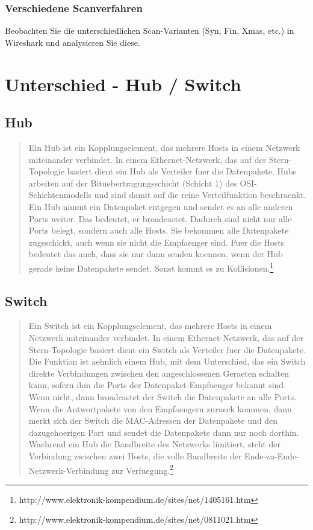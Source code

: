 \documentclass[a4paper]{report}
\begin{document}
\subsection{Verschiedene Scanverfahren}
Beobachten Sie die unterschiedlichen Scan-Varianten (Syn, Fin, Xmas, etc.) in Wireshark und analysieren Sie diese.

\chapter{Unterschied - Hub / Switch}

\section{Hub}
\begin{quote}
Ein Hub ist ein Kopplungselement, das mehrere Hosts in einem Netzwerk miteinander verbindet. In einem Ethernet-Netzwerk, das auf der Stern-Topologie basiert dient ein Hub als Verteiler fuer die Datenpakete. Hubs arbeiten auf der Bituebertragungsschicht (Schicht 1) des OSI-Schichtenmodells und sind damit auf die reine Verteilfunktion beschraenkt.
Ein Hub nimmt ein Datenpaket entgegen und sendet es an alle anderen Ports weiter. Das bedeutet, er broadcastet. Dadurch sind nicht nur alle Ports belegt, sondern auch alle Hosts. Sie bekommen alle Datenpakete zugeschickt, auch wenn sie nicht die Empfaenger sind. Fuer die Hosts bedeutet das auch, dass sie nur dann senden koennen, wenn der Hub gerade keine Datenpakete sendet. Sonst kommt es zu Kollisionen.\footnote{http://www.elektronik-kompendium.de/sites/net/1405161.htm} \end{quote}


\section{Switch}
\begin{quote}
Ein Switch ist ein Kopplungselement, das mehrere Hosts in einem Netzwerk miteinander verbindet. In einem Ethernet-Netzwerk, das auf der Stern-Topologie basiert dient ein Switch als Verteiler fuer die Datenpakete.
Die Funktion ist aehnlich einem Hub, mit dem Unterschied, das ein Switch direkte Verbindungen zwischen den angeschlossenen Geraeten schalten kann, sofern ihm die Ports der Datenpaket-Empfaenger bekannt sind. Wenn nicht, dann broadcastet der Switch die Datenpakete an alle Ports. Wenn die Antwortpakete von den Empfaengern zurueck kommen, dann merkt sich der Switch die MAC-Adressen der Datenpakete und den dazugehoerigen Port und sendet die Datenpakete dann nur noch dorthin.
Waehrend ein Hub die Bandbreite des Netzwerks limitiert, steht der Verbindung zwischen zwei Hosts, die volle Bandbreite der Ende-zu-Ende-Netzwerk-Verbindung zur Verfuegung.\footnote{http://www.elektronik-kompendium.de/sites/net/0811021.htm}
\end{quote}
\end{document}
